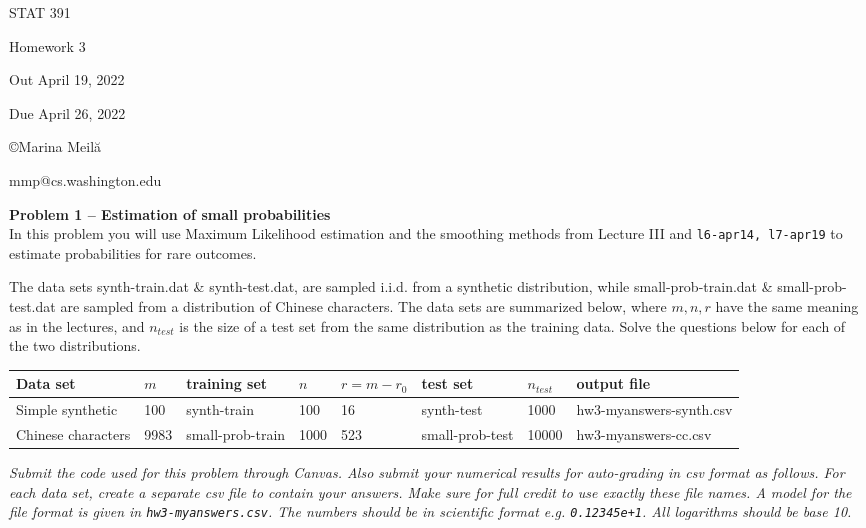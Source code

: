 \documentclass[10pt]{article}
\begin{document}
\begin{Large}
\centerline{STAT 391} 
\centerline{Homework 3}  %
\centerline{Out April 19, 2022}      %
\centerline{Due April 26, 2022}      %
\end{Large}

\centerline{\large \copyright Marina Meil\u{a}}
\centerline{\large mmp@cs.washington.edu}

\newcommand{\test}{_{test}}
\newcommand{\ssss}{_{1,2,3,10,100}}  %
\vspace{2em}



{\bf Problem 1 -- Estimation of small probabilities}
\\
In this problem  you will use Maximum Likelihood estimation and the
smoothing methods from Lecture III and {\tt l6-apr14, l7-apr19} to estimate probabilities for rare outcomes. 

The data sets synth-train.dat \& synth-test.dat, are sampled i.i.d. from a synthetic distribution, while small-prob-train.dat \& small-prob-test.dat are sampled from a distribution of Chinese characters.  The data sets are summarized below, where $m,n,r$ have the same meaning as in the lectures, and $n\test$ is the size of a test set from the same distribution as the training data. Solve the questions below for each of the two distributions.

\begin{tabular}{llllllll}
  Data set &  $m$ &  training set & $n$ &  $r=m-r_0$ &  test set & $n\test$ & output file\\
  \hline
Simple synthetic & 100 & synth-train & 100 & 16 & synth-test & 1000 &hw3-myanswers-synth.csv\\
Chinese characters & 9983 & small-prob-train & 1000 & 523 & small-prob-test & 10000 &hw3-myanswers-cc.csv\\
\hline
\end{tabular}

{\em Submit the code used for this problem through Canvas. Also submit your numerical results for auto-grading in csv format as follows. For each data set, create a separate csv file to contain your answers. Make sure for full credit to use exactly these file names. A model for the file format is given in {\tt hw3-myanswers.csv}. The numbers should be in scientific format e.g. {\tt 0.12345e+1}. All logarithms should be base 10.}   
\end{document}
